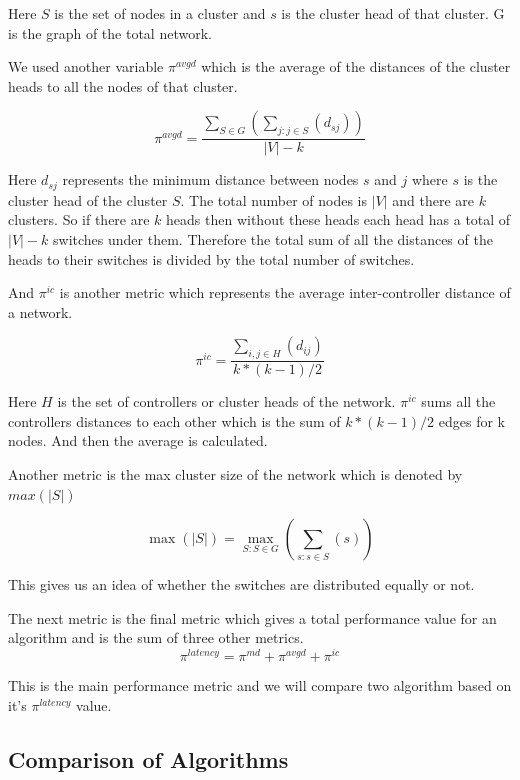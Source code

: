 \documentclass[8pt]{extarticle}
\begin{document}
	Here $S$ is the set of nodes in a cluster and $s$ is the cluster head of that cluster. G is the graph of the total network.
	
	We used another variable $\pi^{avgd}$ which is the average of the distances of the cluster heads to all the nodes of that cluster.
	
	\begin{equation}
	\pi^{avgd}=\frac{\sum_{S\in G}(\sum_{j:j\in S}(d_{sj}))}{|V|-k}
	\end{equation}
	
	Here $d_{sj}$ represents the minimum distance between nodes $s$ and $j$ where $s$ is the cluster head of the cluster $S$. The total number of nodes is $|V|$ and there are $k$ clusters. So if there are $k$ heads then without these heads each head has a total of $|V|-k$ switches under them. Therefore the total sum of all the distances of the heads to their switches is divided by the total number of switches.
	
	And $\pi^{ic}$ is another metric which represents the average inter-controller distance of a network.
	
	\begin{equation}
	\pi^{ic}=\frac{\sum_{i,j\in H}(d_{ij})}{k*(k-1)/2}
	\end{equation}
	
	Here $H$ is the set of controllers or cluster heads of the network. $\pi^{ic}$ sums all the controllers distances to each other which is the sum of $k*(k-1)/2$ edges for k nodes. And then the average is calculated.
		
	Another metric is the max cluster size of the network which is denoted by $max(|S|)$
	
	\begin{equation}
	\max(|S|)=\max_{S:S\in G}(\sum_{s:s\in S}(s))
	\end{equation}
	
	This gives us an idea of whether the switches are distributed equally or not.
	
	The next metric is the final metric which gives a total performance value for an algorithm and is the sum of three other metrics.
	\begin{equation}
	\pi^{latency}=\pi^{md}+\pi^{avgd}+\pi^{ic}
	\end{equation}
	
	This is the main performance metric and we will compare two algorithm based on it's $\pi^{latency}$ value.
	
	\subsection{Comparison of Algorithms}
	
\end{document}

